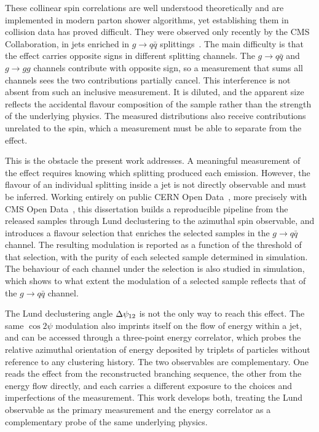 These collinear spin correlations are well understood theoretically and are
implemented in modern parton shower algorithms, yet establishing them in
collision data has proved difficult. They were observed only recently by the CMS
Collaboration, in jets enriched in $g \to q\bar{q}$ splittings~\cite{CMS:2026jnt}.
The main difficulty is that the effect carries opposite signs in different
splitting channels. The $g \to q\bar{q}$ and $g \to gg$ channels contribute with
opposite sign, so a measurement that sums all channels sees the two contributions
partially cancel. This interference is not absent from such an inclusive
measurement. It is diluted, and the apparent size reflects the accidental flavour
composition of the sample rather than the strength of the underlying physics. The
measured distributions also receive contributions unrelated to the spin, which a
measurement must be able to separate from the effect.

This is the obstacle the present work addresses. A meaningful measurement of the
effect requires knowing which splitting produced each emission. However, the
flavour of an individual splitting inside a jet is not directly observable and
must be inferred. Working entirely on public CERN Open Data~\cite{CERNOpenData}, more
precisely with CMS Open Data~\cite{CMSOpenDataGuide}, this dissertation builds a
reproducible pipeline from the released samples through Lund declustering to the
azimuthal spin observable, and introduces a flavour selection that enriches the
selected samples in the $g \to q\bar{q}$ channel. The resulting modulation is
reported as a function of the threshold of that selection, with the purity of
each selected sample determined in simulation. The behaviour of each channel under
the selection is also studied in simulation, which shows to what extent the
modulation of a selected sample reflects that of the $g \to q\bar{q}$ channel.

The Lund declustering angle $\Delta\psi_{12}$ is not the only way to reach this effect. The
same $\cos 2\psi$ modulation also imprints itself on the flow of energy within a
jet, and can be accessed through a three-point energy correlator, which probes the
relative azimuthal orientation of energy deposited by triplets of particles
without reference to any clustering history. The two observables are
complementary. One reads the effect from the reconstructed branching sequence, the
other from the energy flow directly, and each carries a different exposure to the
choices and imperfections of the measurement. This work develops both, treating
the Lund observable as the primary measurement and the energy correlator as a
complementary probe of the same underlying physics.

